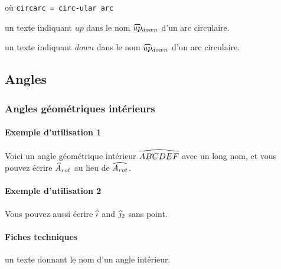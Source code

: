 \documentclass[12pt,a4paper]{article}
\theoremstyle{definition}
\begin{document}
\bigskip


 où \quad \verb+circarc = circ-ular arc+

 un texte indiquant $up$ dans le nom $\circarc*{up}{down}$ d'un arc circulaire.

 un texte indiquant $down$ dans le nom $\circarc*{up}{down}$ d'un arc circulaire.





\subsection{Angles}

		\subsubsection{Angles géométriques intérieurs}

\paragraph{Exemple d'utilisation 1}

\begin{tcblisting}{}
Voici un angle géométrique intérieur $\anglein{ABCDEF}$ avec un long nom, et vous
pouvez écrire $\anglein*{A}{rot}$ au lieu de $\anglein{A_{rot}}$.
\end{tcblisting}


\paragraph{Exemple d'utilisation 2}

\begin{tcblisting}{}
Vous pouvez aussi écrire $\anglein{i}$ and $\anglein*{j}{2}$ sans point.
\end{tcblisting}



\paragraph{Fiches techniques}


\IDarg{} un texte donnant le nom d'un angle intérieur.
\end{document}
